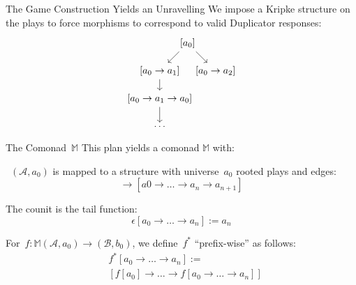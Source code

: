 \documentclass{beamer}
\newcommand{\As}{\mathcal{A}}
\newcommand{\Bs}{\mathcal{B}}
\newcommand{\M}{\mathbb{M}}
\newcommand{\aplayn}[1]{[a_0 \rightarrow \ldots \rightarrow a_{#1}]}
\newcommand{\aplay}{\aplayn{n}}
\begin{document}
\begin{frame}{The Game Construction Yields an Unravelling}
    We impose a Kripke structure on the plays to force morphisms to correspond to valid Duplicator responses:
    \begin{equation*}
        \begin{tikzpicture}
        \path 
        node (a) {$[a_0]$} +(-1,-1) 
        node (b) {$[a_0 \rightarrow a_1]$} ++(1,-1)
        node (c) {$[a_0 \rightarrow a_2]$} (b) ++(0,-1)
        node (a') {$[a_0 \rightarrow a_1 \rightarrow a_0]$} ++(0,-1)
        node (dots) {$\ldots$};
        \path[->]
        (a) edge (b)
        (a) edge (c)
        (b) edge (a')
        (a') edge (dots);
        \end{tikzpicture}
    \end{equation*}
\end{frame}

\begin{frame}{The Comonad~$\M$}
    This plan yields a comonad $\M$ with:
    \begin{description}
    \item[Object mapping:]~$(\As,a_0)$ is mapped to a structure with universe~$a_0$ rooted plays and edges:
    \begin{equation*}
        \aplay \rightarrow [a0 \rightarrow \ldots \rightarrow a_n \rightarrow a_{n + 1}]
    \end{equation*}
    \item[Counit:] The counit is the tail function:
    \begin{equation*}
        \epsilon\aplay := a_n
    \end{equation*}
    \item[Kleisli co-extension:] For~$f : \M (\As,a_0) \rightarrow (\Bs, b_0)$, we define~$f^*$ ``prefix-wise'' as follows:
    \begin{align*}
        &f^*\aplay :=\\ 
        &[f[a_0] \rightarrow \ldots \rightarrow f\aplay]
    \end{align*}
    \end{description}
\end{frame}
\end{document}

